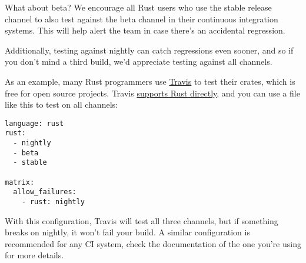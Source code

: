 What about beta? We encourage all Rust users who use the stable release channel to also test against the beta channel 
in their continuous integration systems. This will help alert the team in case there's an accidental regression.

\blank

Additionally, testing against nightly can catch regressions even sooner, and so if you don't mind a third build, we'd 
appreciate testing against all channels.

\blank

As an example, many Rust programmers use \href{https://travis-ci.org/}{Travis} to test their crates, which is free for 
open source projects. Travis \href{http://docs.travis-ci.com/user/languages/rust/}{supports Rust directly}, and you can 
use a  file like this to test on all channels:

\begin{verbatim}
language: rust
rust:
  - nightly
  - beta
  - stable

matrix:
  allow_failures:
    - rust: nightly

\end{verbatim}

With this configuration, Travis will test all three channels, but if something breaks on nightly, it won't fail your 
build. A similar configuration is recommended for any CI system, check the documentation of the one you're using for 
more details.
